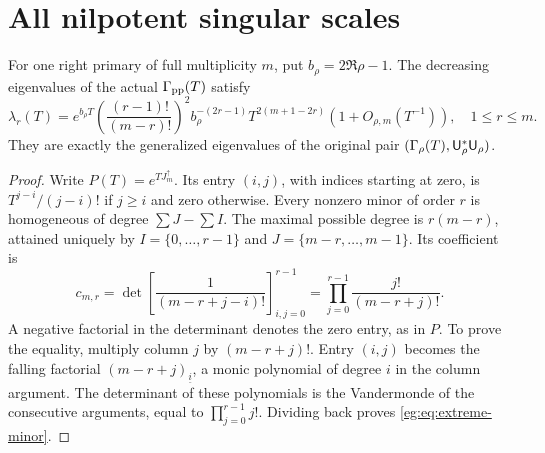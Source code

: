 \section{All nilpotent singular scales}\label{eg:sec:nilpotent}
\begin{egtheorem}\label{eg:thm:scales}
For one right primary of full multiplicity $m$, put $b_\rho=2\Re\rho-1$.
The decreasing eigenvalues of the actual $\Gamma_{\rm pp}(T)$ satisfy
\[
 \lambda_r(T)=e^{b_\rho T}
 \left(\frac{(r-1)!}{(m-r)!}\right)^2 b_\rho^{-(2r-1)}
 T^{2(m+1-2r)}(1+O_{\rho,m}(T^{-1})),\quad 1\le r\le m.
 \tag{EG42}\label{eg:eq:all-scales}
\]
They are exactly the generalized eigenvalues of the original pair
$(\Gamma_\rho(T),\mathsf U_\rho^*\mathsf U_\rho)$.
\end{egtheorem}
\begin{proof}
Write $P(T)=e^{TJ_m^\uparrow}$. Its entry $(i,j)$, with indices
starting at zero, is $T^{j-i}/(j-i)!$ if $j\ge i$ and zero otherwise.
Every nonzero minor of order $r$ is homogeneous of degree
$\sum J-\sum I$. The maximal possible degree is $r(m-r)$,
attained uniquely by $I=\{0,\ldots,r-1\}$ and
$J=\{m-r,\ldots,m-1\}$. Its coefficient is
\[
 c_{m,r}=\det\left[\frac1{(m-r+j-i)!}\right]_{i,j=0}^{r-1}
                  =\prod_{j=0}^{r-1}\frac{j!}{(m-r+j)!}.
 \tag{EG43}\label{eg:eq:extreme-minor}
\]
A negative factorial in the determinant denotes the zero entry,
as in $P$. To prove the equality, multiply column $j$ by
$(m-r+j)!$. Entry $(i,j)$ becomes the falling factorial
$(m-r+j)_{\underline i}$, a monic polynomial of degree $i$ in
the column argument. The determinant of these polynomials is the
Vandermonde of the consecutive arguments, equal to
$\prod_{j=0}^{r-1}j!$. Dividing back proves \eqref{eg:eq:extreme-minor}.


\end{proof}
